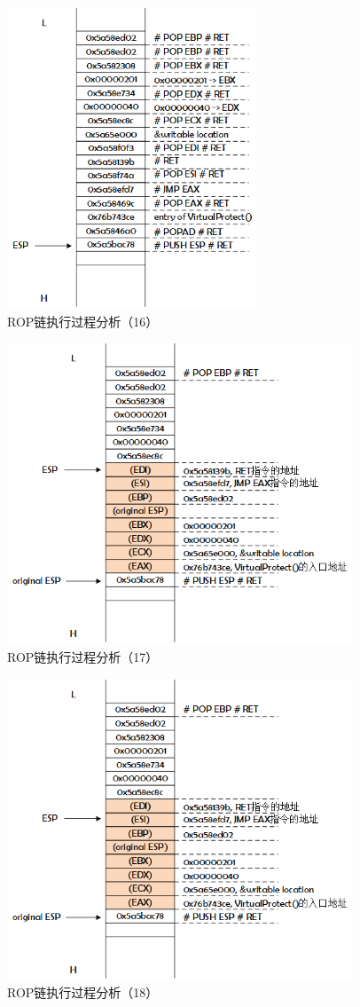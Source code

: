 \documentclass[bachelor]{thesis-uestc}
\begin{document}
\begin{figure}[htbp]
	\centering\includegraphics[height=9cm]{images/rop_chain_s16.png}
	\caption{ROP链执行过程分析（16）}
	\label{fig:rop_chain_s16}
\end{figure}

\begin{figure}[htbp]
	\centering\includegraphics[height=9cm]{images/rop_chain_s17.png}
	\caption{ROP链执行过程分析（17）}
	\label{fig:rop_chain_s17}
\end{figure}

\begin{figure}[htbp]
	\centering\includegraphics[height=9cm]{images/rop_chain_s18.png}
	\caption{ROP链执行过程分析（18）}
	\label{fig:rop_chain_s18}
\end{figure}
\end{document}
